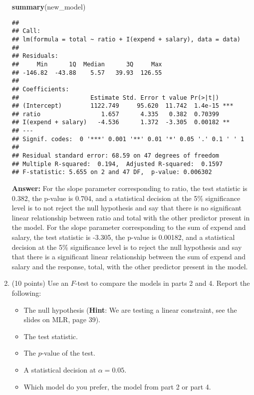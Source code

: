 \documentclass[
]{article}
\newenvironment{Shaded}{\begin{snugshade}}{\end{snugshade}}
\newcommand{\FunctionTok}[1]{\textcolor[rgb]{0.13,0.29,0.53}{\textbf{#1}}}
\newcommand{\NormalTok}[1]{#1}
\providecommand{\tightlist}{%
  \setlength{\itemsep}{0pt}\setlength{\parskip}{0pt}}
\begin{document}
\begin{enumerate}
\begin{Shaded}
\begin{Highlighting}[]
\FunctionTok{summary}\NormalTok{(new\_model)}
\end{Highlighting}
\end{Shaded}

\begin{verbatim}
## 
## Call:
## lm(formula = total ~ ratio + I(expend + salary), data = data)
## 
## Residuals:
##     Min      1Q  Median      3Q     Max 
## -146.82  -43.88    5.57   39.93  126.55 
## 
## Coefficients:
##                    Estimate Std. Error t value Pr(>|t|)    
## (Intercept)        1122.749     95.620  11.742  1.4e-15 ***
## ratio                 1.657      4.335   0.382  0.70399    
## I(expend + salary)   -4.536      1.372  -3.305  0.00182 ** 
## ---
## Signif. codes:  0 '***' 0.001 '**' 0.01 '*' 0.05 '.' 0.1 ' ' 1
## 
## Residual standard error: 68.59 on 47 degrees of freedom
## Multiple R-squared:  0.194,  Adjusted R-squared:  0.1597 
## F-statistic: 5.655 on 2 and 47 DF,  p-value: 0.006302
\end{verbatim}

  \textbf{Answer:} For the slope parameter corresponding to ratio, the
  test statistic is 0.382, the p-value is 0.704, and a statistical
  decision at the 5\% significance level is to not reject the null
  hypothesis and say that there is no significant linear relationship
  between ratio and total with the other predictor present in the model.
  For the slope parameter corresponding to the sum of expend and salary,
  the test statistic is -3.305, the p-value is 0.00182, and a
  statistical decision at the 5\% significance level is to reject the
  null hypothesis and say that there is a significant linear
  relationship between the sum of expend and salary and the response,
  total, with the other predictor present in the model.
\item
  (10 points) Use an \(F\)-test to compare the models in parts 2 and 4.
  Report the following:

  \begin{itemize}
  \tightlist
  \item
    The null hypothesis (\textbf{Hint}: We are testing a linear
    constraint, see the slides on MLR, page 39).
  \item
    The test statistic.
  \item
    The \(p\)-value of the test.
  \item
    A statistical decision at \(\alpha = 0.05\).
  \item
    Which model do you prefer, the model from part 2 or part 4.
  \end{itemize}


\end{enumerate}
\end{document}
